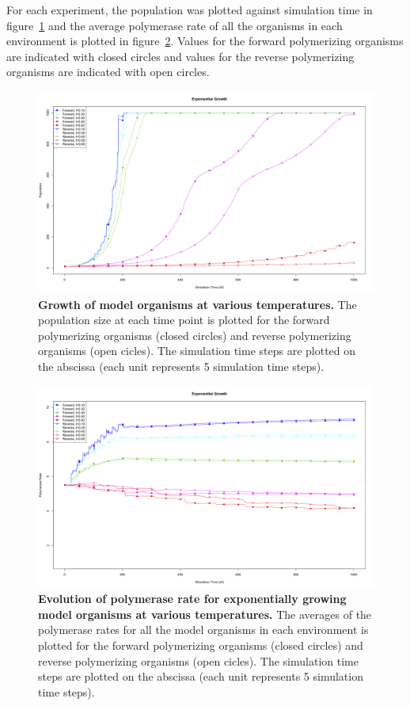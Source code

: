 For each experiment, the population was plotted against simulation time in figure~\ref{fig:temp_incr_num} and the average polymerase rate of all the organisms in each environment is plotted in figure~\ref{fig:temp_incr_rate}. Values for the forward polymerizing organisms are indicated with closed circles and values for the reverse polymerizing organisms are indicated with open circles.

\begin{figure}[h]
	\centering
		\includegraphics[width=\textwidth]{temp_incr_num}
	\caption{\textbf{Growth of model organisms at various temperatures.} The population size at each time point is plotted for the forward polymerizing organisms (closed circles) and reverse polymerizing organisms (open cicles). The simulation time steps are plotted on the abscissa (each unit represents 5 simulation time steps).}
	\label{fig:temp_incr_num}
\end{figure}

\begin{figure}[h]
	\centering
		\includegraphics[width=\textwidth]{temp_incr_rate}
	\caption{\textbf{Evolution of polymerase rate for exponentially growing model organisms at various temperatures.} The averages of the polymerase rates for all the model organisms in each environment is plotted for the forward polymerizing organisms (closed circles) and reverse polymerizing organisms (open cicles). The simulation time steps are plotted on the abscissa (each unit represents 5 simulation time steps).}
	\label{fig:temp_incr_rate}
\end{figure}


